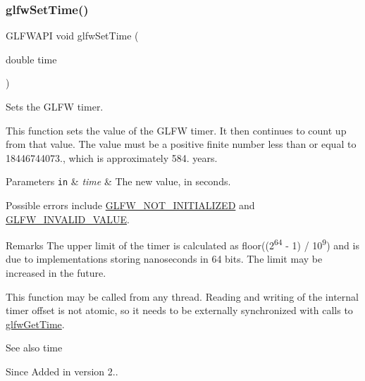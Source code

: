 \subsubsection{\texorpdfstring{glfw\+Set\+Time()}{glfwSetTime()}}
{\footnotesize\ttfamily G\+L\+F\+W\+A\+PI void glfw\+Set\+Time (\begin{DoxyParamCaption}\item[{double}]{time }\end{DoxyParamCaption})}



Sets the G\+L\+FW timer. 

This function sets the value of the G\+L\+FW timer. It then continues to count up from that value. The value must be a positive finite number less than or equal to 18446744073., which is approximately 584. years.


\begin{DoxyParams}[1]{Parameters}
\mbox{\tt in}  & {\em time} & The new value, in seconds.\\
\hline
\end{DoxyParams}
Possible errors include \hyperlink{group__errors_ga2374ee02c177f12e1fa76ff3ed15e14a}{G\+L\+F\+W\+\_\+\+N\+O\+T\+\_\+\+I\+N\+I\+T\+I\+A\+L\+I\+Z\+ED} and \hyperlink{group__errors_gaaf2ef9aa8202c2b82ac2d921e554c687}{G\+L\+F\+W\+\_\+\+I\+N\+V\+A\+L\+I\+D\+\_\+\+V\+A\+L\+UE}.

\begin{DoxyRemark}{Remarks}
The upper limit of the timer is calculated as floor((2\textsuperscript{64} -\/ 1) / 10\textsuperscript{9}) and is due to implementations storing nanoseconds in 64 bits. The limit may be increased in the future.
\end{DoxyRemark}
This function may be called from any thread. Reading and writing of the internal timer offset is not atomic, so it needs to be externally synchronized with calls to \hyperlink{group__input_ga03d4a1039b8662c71eeb40beea8cb622}{glfw\+Get\+Time}.

\begin{DoxySeeAlso}{See also}
time
\end{DoxySeeAlso}
\begin{DoxySince}{Since}
Added in version 2.. 
\end{DoxySince}
